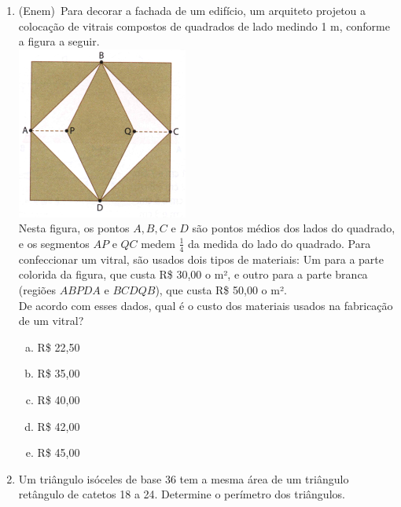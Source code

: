 \documentclass[a4paper,14pt]{article}
\begin{document}
\begin{multicols}{2}
\begin{enumerate}
	        \item (Enem)~Para decorar a fachada de um edifício, um arquiteto projetou a colocação de vitrais compostos de quadrados de lado medindo 1 m, conforme a figura a seguir.\\
	        \includegraphics[width=1\linewidth]{8FMA25_imagens/imagem7}\\
	        Nesta figura, os pontos $A, B, C$ e $D$ são pontos médios dos lados do quadrado, e os segmentos $AP$ e $QC$ medem $\frac{1}{4}$ da medida do lado do quadrado. Para confeccionar um vitral, são usados dois tipos de materiais: Um para a parte colorida da figura, que custa R\$ 30,00 o m², e outro para a parte branca (regiões $ABPDA$ e $BCDQB$), que custa R\$ 50,00 o m².\\
	        De acordo com esses dados, qual é o custo dos materiais usados na fabricação de um vitral?
	        \begin{enumerate}[a)]
	        	\item R\$ 22,50
	        	\item R\$ 35,00
	        	\item R\$ 40,00
	        	\item R\$ 42,00
	        	\item R\$ 45,00
	        \end{enumerate}
            \item Um triângulo isóceles de base 36 tem a mesma área de um triângulo retângulo de catetos 18 a 24. Determine o perímetro dos triângulos.

\end{enumerate}
\end{multicols}
\end{document}
